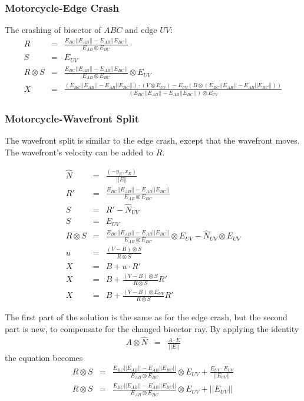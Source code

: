 \documentclass[12pt,a4paper,oneside,openany]{article}
\begin{document}
\subsubsection{Motorcycle-Edge Crash}

The crashing of bisector of $ABC$ and edge $UV$:
\begin{eqnarray*}
R &=& \frac{E_{BC} || E_{AB} || - E_{AB}|| E_{BC} ||}{E_{AB} \otimes E_{BC}} \\
S &=& E_{UV} \\
R \otimes S &=& \frac{E_{BC} || E_{AB} || - E_{AB}|| E_{BC} ||}{E_{AB} \otimes E_{BC}} \otimes E_{UV} \\
X &=& \frac{(E_{BC} || E_{AB} || - E_{AB}|| E_{BC} ||) \cdot (V \otimes E_{UV}) - E_{UV} (B \otimes (E_{BC} || E_{AB} || - E_{AB}|| E_{BC} ||))}{(E_{BC} || E_{AB} || - E_{AB}|| E_{BC} ||) \otimes E_{UV}}
\end{eqnarray*}


\subsubsection{Motorcycle-Wavefront Split}

The wavefront split is similar to the edge crash, except that the wavefront moves. The wavefront's velocity can be added to $R$. 

\begin{eqnarray*}
\hat{N} &=& \frac{(-y_E, x_E)}{||E||}\\
R' &=& \frac{E_{BC} || E_{AB} || - E_{AB}|| E_{BC} ||}{E_{AB} \otimes E_{BC}} \\
S &=& R' - \hat{N}_{UV} \\
S &=& E_{UV} \\
R \otimes S &=& \frac{E_{BC} || E_{AB} || - E_{AB}|| E_{BC} ||}{E_{AB} \otimes E_{BC}} \otimes E_{UV} - \hat{N}_{UV} \otimes E_{UV} \\
u &=& \frac{(V-B) \otimes S}{R \otimes S} \\
X &=& B+u \cdot R' \\
X &=& B+\frac{(V-B) \otimes S}{R \otimes S} R' \\
X &=& B+\frac{(V-B) \otimes E_{UV}}{R \otimes S} R' 
\end{eqnarray*}

The first part of the solution is the same as for the edge crash, but the second part is new, to compensate for the changed bisector ray. By applying the identity
\begin{eqnarray*}
A \otimes \hat{N} &=& \frac{A \cdot E}{||E||}
\end{eqnarray*}
the equation becomes
\begin{eqnarray*}
R \otimes S &=& \frac{E_{BC} || E_{AB} || - E_{AB}|| E_{BC} ||}{E_{AB} \otimes E_{BC}} \otimes E_{UV} + \frac{ E_{UV} \cdot E_{UV}}{||E_{UV}||} \\
R \otimes S &=& \frac{E_{BC} || E_{AB} || - E_{AB}|| E_{BC} ||}{E_{AB} \otimes E_{BC}} \otimes E_{UV} + ||E_{UV}|| \\
\end{eqnarray*}
\end{document}
